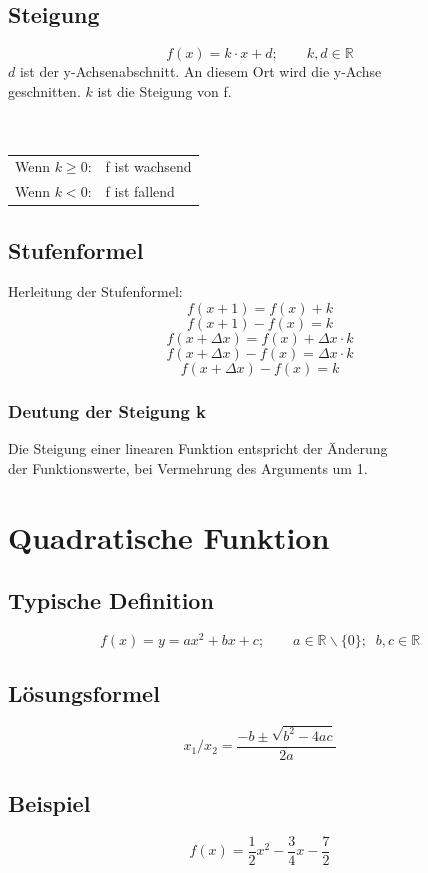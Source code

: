 \documentclass[12pt,a4paper]{scrbook}
\begin{document}
\subsection{Steigung}
\[f(x) = k\cdot x + d; \quad\quad k,d \in \mathbb{R}\]
$d$ ist der y-Achsenabschnitt. An diesem Ort wird die y-Achse\\
geschnitten. $k$ ist die Steigung von f.\\\\\\
\begin{tabular}{ll}
Wenn $k \geq 0$: & f ist wachsend\\
Wenn $k < 0$: & f ist fallend\\
\end{tabular}

\subsection{Stufenformel}
Herleitung der Stufenformel:
\[f(x+1) = f(x) + k\]
\[f(x+1) - f(x) = k\]
\[f(x+\Delta x) = f(x) + \Delta x \cdot k\]
\[f(x+\Delta x) - f(x) = \Delta x \cdot k\]
\[f(x+\Delta x) - f(x) = k\]

\begin{center}
\fbox{\parbox{4cm}{\[\frac{\Delta y}{\Delta x} = k\]}}
\end{center}


\subsubsection{Deutung der Steigung k}
Die Steigung einer linearen Funktion entspricht der Änderung\\
der Funktionswerte, bei Vermehrung des Arguments um 1.

\section{Quadratische Funktion}
\subsection{Typische Definition}
\[f(x) = y = ax^2 + bx + c; \quad\quad a \in \mathbb{R}\backslash\{0\}; \;\; b, c \in \mathbb{R}\]
\subsection{Lösungsformel}
\[x_1 / x_2 = \frac{-b \pm \sqrt{b^2-4ac}}{2a} \]
\subsection{Beispiel}
\[f(x) = \frac{1}{2}x^2 - \frac{3}{4}x - \frac{7}{2}\]
\end{document}
